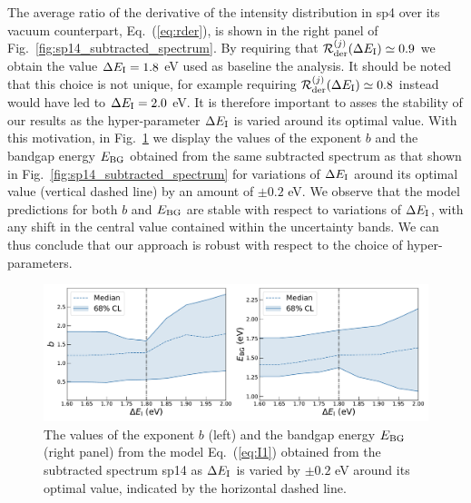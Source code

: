 The average ratio of the derivative of the intensity
distribution in sp4 over its vacuum counterpart, Eq.~(\ref{eq:rder}), is shown
in the right panel of  Fig.~\ref{fig:sp14_subtracted_spectrum}. 
%
By requiring that $\mathcal{R}^{(j)}_{\rm der}(\Delta E_{\rm I})\simeq 0.9$ we obtain
the value $\Delta E_{\rm I}=1.8$ eV used as baseline the analysis.
%
It should be noted that this choice is not unique, for example requiring
$\mathcal{R}^{(j)}_{\rm der}(\Delta E_{\rm I})\simeq 0.8$ instead would have led
to $\Delta E_{\rm I}=2.0$ eV.
%
It is therefore important to asses the stability of our results as the hyper-parameter $\Delta E_{\rm I}$
is varied around its optimal value.
%
With this motivation, in Fig.~\ref{fig:bvalues_sampleA} we display the
values of the exponent $b$
and the bandgap energy $E_{\rm BG}$ 
obtained from the same subtracted spectrum as that shown in
Fig.~\ref{fig:sp14_subtracted_spectrum} for variations of $\Delta E_{\rm I}$ 
around its optimal value (vertical dashed line) by an amount
of $\pm 0.2$ eV.
%
We observe that the model predictions for both $b$ and $E_{\rm BG}$ are stable with respect
to variations of $\Delta E_{\rm I}$, with any shift in the central value contained within the
uncertainty bands.
%
We can thus conclude that our approach is robust with respect to the choice of
hyper-parameters.

\begin{figure}[t]
\begin{centering}
  \includegraphics[width=0.99\linewidth]{plots/Stability_plots_sp14.pdf} 
  \caption{\small The values of the exponent $b$ (left)
    and the bandgap energy $E_{\rm BG}$ (right panel) from the model Eq.~(\ref{eq:I1})
    obtained from the subtracted spectrum sp14 as $\Delta E_{\rm I}$ is varied by $\pm 0.2$ eV
    around its optimal value, indicated by the horizontal dashed line.
  }
\label{fig:bvalues_sampleA}
\end{centering}
\end{figure}

